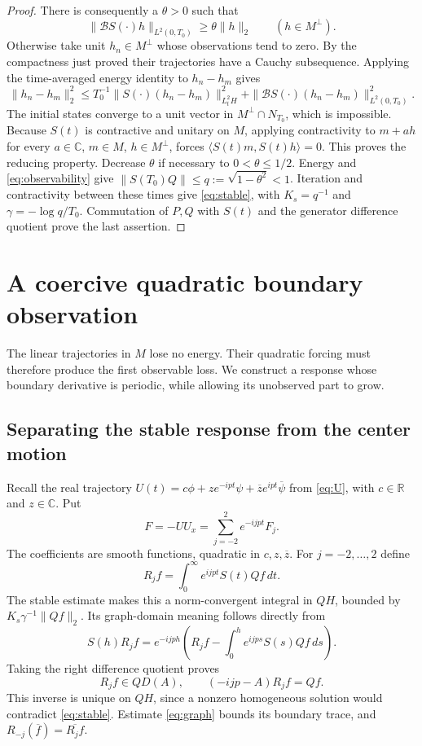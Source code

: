 \documentclass[11pt]{article}
\theoremstyle{remark}\newtheorem{remark}[theorem]{Remark}
\numberwithin{equation}{section}
\begin{document}
\begin{proof}
There is consequently a $\theta>0$ such that
\begin{equation}\label{eq:observability}
 \|\mathcal BS(\cdot)h\|_{L^2(0,T_0)}\ge\theta\|h\|_2
 \qquad(h\in M^\perp).
\end{equation}
Otherwise take unit $h_n\in M^\perp$ whose observations tend to zero.
By the compactness just proved their trajectories have a Cauchy subsequence.
Applying the time-averaged energy identity to $h_n-h_m$ gives
\[
 \|h_n-h_m\|_2^2\le T_0^{-1}\|S(\cdot)(h_n-h_m)\|_{L^2_tH}^2
 +\|\mathcal BS(\cdot)(h_n-h_m)\|_{L^2(0,T_0)}^2.
\]
The initial states converge to a unit vector in $M^\perp\cap N_{T_0}$,
which is impossible.
Because $S(t)$ is contractive and unitary on $M$, applying contractivity to
$m+ah$ for every $a\in\mathbb C$, $m\in M$, $h\in M^\perp$, forces
$\langle S(t)m,S(t)h\rangle=0$. This proves the reducing property.
Decrease $\theta$ if necessary to $0<\theta\le1/2$. Energy and
\eqref{eq:observability} give $\|S(T_0)Q\|\le q:=\sqrt{1-\theta^2}<1$.
Iteration and contractivity between these times give \eqref{eq:stable},
with $K_s=q^{-1}$ and $\gamma=-\log q/T_0$.
Commutation of $P,Q$ with $S(t)$ and the generator difference quotient prove
the last assertion.
\end{proof}

\section{A coercive quadratic boundary observation}\label{sec:quadratic}
The linear trajectories in $M$ lose no energy. Their quadratic forcing must
therefore produce the first observable loss. We construct a response whose
boundary derivative is periodic, while allowing its unobserved part to grow.

\subsection{Separating the stable response from the center motion}
Recall the real trajectory $U(t)=c\phi+ze^{-ipt}\psi+\overline z e^{ipt}\overline\psi$ from \eqref{eq:U}, with $c\in\mathbb R$ and $z\in\mathbb C$. Put
\begin{equation}\label{eq:force}
 F=-UU_x=\sum_{j=-2}^2e^{-ijpt}F_j.
\end{equation}
The coefficients are smooth functions, quadratic in $c,z,\overline z$.
For $j=-2,\ldots,2$ define
\begin{equation}\label{eq:resolvent}
 R_j f=\int_0^\infty e^{ijpt}S(t)Qf\,dt.
\end{equation}
The stable estimate makes this a norm-convergent integral in $QH$, bounded
by $K_s\gamma^{-1}\|Qf\|_2$. Its graph-domain meaning follows directly from
\[
 S(h)R_jf=e^{-ijph}\left(R_jf-\int_0^h e^{ijps}S(s)Qf\,ds\right).
\]
Taking the right difference quotient proves
\begin{equation}\label{eq:inverse}
 R_jf\in QD(A),\qquad (-ijp-A)R_jf=Qf.
\end{equation}
This inverse is unique on $QH$, since a nonzero homogeneous solution would
contradict \eqref{eq:stable}. Estimate \eqref{eq:graph} bounds its boundary
trace, and $R_{-j}(\overline f)=\overline{R_jf}$.
\end{document}
